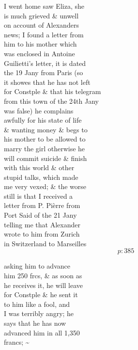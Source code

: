 \documentclass{report}
\begin{document}
	\par{
 	I went home saw Eliza, she\ \\is much grieved \& unwell\ \\on account of Alexanders\ \\news; I found a letter from\ \\him to his mother which\ \\was enclosed in Antoine\ \\Guilietti’s letter, it is dated\ \\the 19 Jany from Paris (so\ \\it showes that he has not left\ \\for Constple \& that his telegram\ \\from this town of the 24th Jany\ \\was false) he complains\ \\awfully for his state of life\ \\\& wanting money \& begs to\ \\his mother to be allowed to\ \\marry the girl otherwise he\ \\will commit suicide \& finish\ \\with this world \& other\ \\stupid talks, which made\ \\me very vexed; \& the worse\ \\still is that I received a\ \\letter from P. Pièrre from\ \\Port Said of the 21 Jany\ \\telling me that Alexander\ \\wrote to him from Zurich\ \\in Switzerland to Marseilles\ \\
  \[p: 385 \]

	}


	\par{
 	asking him to advance\ \\him 250 frcs, \& as soon as\ \\he receives it, he will leave\ \\for Constple \& he sent it\ \\to him like a fool, and\ \\I was terribly angry; he\ \\says that he has now\ \\advanced him in all 1,350\ \\francs; \~{}\ \\
	}
\end{document}

